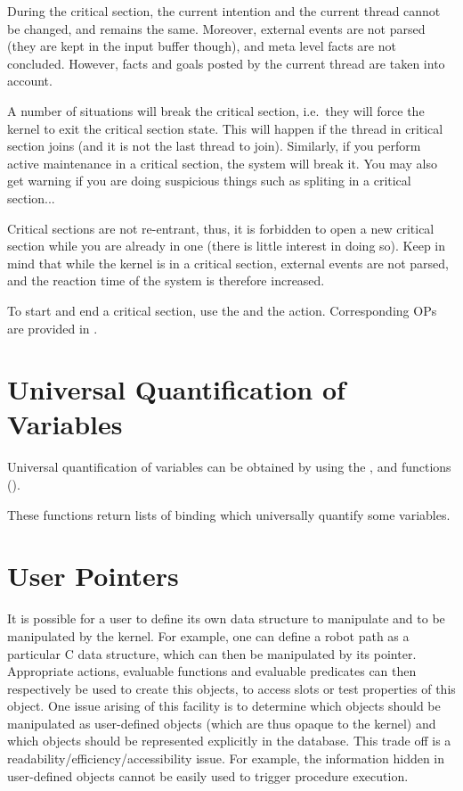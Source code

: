 During the critical section, the current intention and the current thread
cannot be changed, and remains the same. Moreover, external events are not
parsed (they are kept in the input buffer though), and meta level facts are not
concluded. However, facts and goals posted by the current thread are taken into
account.

A number of situations will break the critical section, i.e.\ they will force the
kernel to exit the critical section state. This will happen if the thread in
critical section joins (and it is not the last thread to join). Similarly, if
you perform active maintenance in a critical section, the system will break it.
You may also get warning if you are doing suspicious things such as spliting in
a critical section...

Critical sections are not re-entrant, thus, it is forbidden to open a new
critical section while you are already in one (there is little interest in
doing so). Keep in mind that while the kernel is in a critical section,
external events are not parsed, and the reaction time of the system is
therefore increased.

To start and end a critical section, use the  and
the  action. Corresponding OPs are provided in
.

\section{Universal Quantification of Variables}

Universal quantification of variables can be obtained by using the ,
 and  functions ().

These functions return lists of binding which universally quantify some variables.

\section{User Pointers}

It is possible for a user to define its own data structure to manipulate and to
be manipulated by the kernel. For example, one can define a robot path as a
particular C data structure, which can then be manipulated by its pointer.
Appropriate actions, evaluable functions and evaluable predicates can then
respectively be used to create this objects, to access slots or test properties
of this object. One issue arising of this facility is to determine which
objects should be manipulated as user-defined objects (which are thus opaque to
the kernel) and which objects should be represented explicitly in the database.
This trade off is a readability/efficiency/accessibility issue. For example,
the information hidden in user-defined objects cannot be easily used to trigger
procedure execution.

